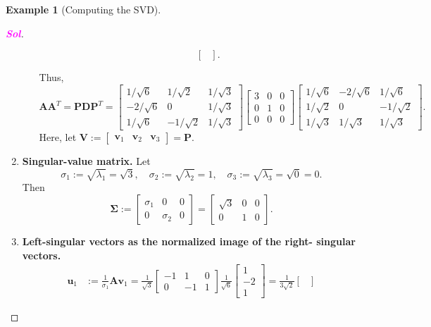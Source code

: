 \documentclass[12pt,openany]{book}
\theoremstyle{definition}
\newtheorem{example}{Example}[chapter]
\newcommand{\sol}{\textcolor{magenta}{\bf Sol}}
\renewcommand{\vec}[1]{\textbf{#1}}
\begin{document}
\begin{example}[Computing the SVD]
\begin{proof}[\sol]
\begin{enumerate}[(Step 1)]
\begin{enumerate}[(i)]
\begin{enumerate}[(a)]
\[\begin{bmatrix}
						\end{bmatrix}.
						\]
					\end{enumerate}
					Thus, \[
					\textbf{A}\textbf{A}^T=\textbf{PDP}^T=\begin{bmatrix}
						1/\sqrt{6} & 1/\sqrt{2} & 1/\sqrt{3}\\
						-2/\sqrt{6} & 0 & 1/\sqrt{3}\\
						1/\sqrt{6} & -1/\sqrt{2} & 1/\sqrt{3}
					\end{bmatrix}\begin{bmatrix}
					3&0&0\\0&1&0\\0&0&0
				\end{bmatrix}\begin{bmatrix}
				1/\sqrt{6} & -2/\sqrt{6} & 1/\sqrt{6}\\
				1/\sqrt{2} & 0 & -1/\sqrt{2}\\
				1/\sqrt{3} & 1/\sqrt{3} & 1/\sqrt{3}
			\end{bmatrix}.
					\] Here, let \(\textbf{V}:=\begin{bmatrix}
						\vec{v}_1&\vec{v}_2&\vec{v}_3
					\end{bmatrix}=\textbf{P}\).
				\end{enumerate}
				\item \textbf{Singular-value matrix.} Let \[
				\sigma_1:=\sqrt{\lambda_1}=\sqrt{3},\quad\sigma_2:=\sqrt{\lambda_2}=1,\quad\sigma_3:=\sqrt{\lambda_3}=\sqrt{0}=0.
				\] Then \[
				\boldsymbol{\Sigma}:=\begin{bmatrix}
					\sigma_1 & 0 & 0\\
					0 & \sigma_2 & 0
				\end{bmatrix}=\begin{bmatrix}
				\sqrt{3} & 0 & 0\\
				0 & 1 & 0
			\end{bmatrix}.
				\]
				\item \textbf{Left-singular vectors as the normalized image of the right-
				singular vectors.} \begin{align*}
				\vec{u}_1&:=\frac{1}{\sigma_1}\textbf{A}\vec{v}_1=\frac{1}{\sqrt{3}}\begin{bmatrix}
					-1 & 1 & 0\\
					0 & -1 & 1
				\end{bmatrix}\frac{1}{\sqrt{6}}\begin{bmatrix}
				1\\-2\\1
			\end{bmatrix}=\frac{1}{3\sqrt{2}}\begin{bmatrix}

\end{bmatrix}
\end{align*}
\end{enumerate}
\end{proof}
\end{example}
\end{document}

